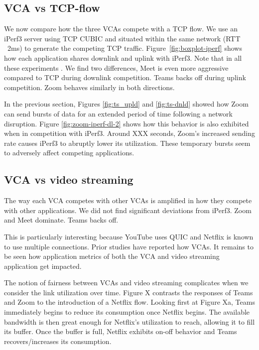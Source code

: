 \subsection{VCA vs TCP-flow}
We now compare how the three VCAs compete with a TCP flow. We use an iPerf3 server using TCP CUBIC and situated within the same network (RTT ~2ms) to generate the competing TCP traffic. Figure~\ref{fig:boxplot-iperf} shows how each application shares downlink and uplink with iPerf3. Note that in all these experiments . We find two differences, Meet is even more aggressive compared to TCP during downlink competition. Teams backs off during uplink competition. Zoom behaves similarly in both directions.  

In the previous section, Figures \ref{fig:ts_upld} and \ref{fig:ts-dnld} showed how Zoom can send bursts of data for an extended period of time following a network disruption. Figure \ref{fig:zoom-iperf-dl-2} shows how this behavior is also exhibited when in competition with iPerf3. Around XXX seconds, Zoom's increased sending rate causes iPerf3 to abruptly lower its utilization. These temporary bursts seem to adversely affect competing applications. 


\subsection{VCA vs video streaming}
The way each VCA competes with other VCAs is amplified in how they compete with other applications. We did not find significant deviations from iPerf3. Zoom and Meet dominate. Teams backs off. 

This is particularly interesting because YouTube uses QUIC and Netflix is known to use multiple connections. Prior studies have reported how VCAs. It remains to be seen how application metrics of both the VCA and video streaming application get impacted. 

The notion of fairness between VCAs and video streaming complicates when we consider the link utilization over time. Figure X contrasts the responses of Teams and Zoom to the introduction of a Netflix flow. Looking first at Figure Xa, Teams immediately begins to reduce its consumption once Netflix begins. The available bandwidth is then great enough for Netflix's utilization to reach, allowing it to fill its buffer. Once the buffer is full, Netflix exhibits on-off behavior and Teams recovers/increases its consumption. 

